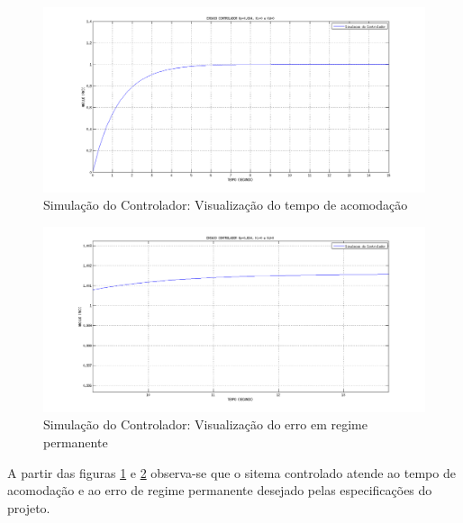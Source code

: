 \documentclass[12pt,oneside,a4paper, chapter=TITLE, section = TITLE, english, brazil]{abntex2}
\begin{document}
\begin{figure}[h] %
\centering
\includegraphics[scale=0.42]{./imagens/Simu_cont}
\caption[Simulação do Controlador: Visualização do tempo de acomodação]{Simulação do Controlador: Visualização do tempo de acomodação}
\label{fig:Simu_cont}
\end{figure}

\begin{figure}[h] %
\centering
\includegraphics[scale=0.42]{./imagens/Simu_cont_erro}
\caption[Simulação do Controlador: Visualização do erro em regime permanente]{Simulação do Controlador: Visualização do erro em regime permanente}
\label{fig:Simu_cont_erro}
\end{figure}

A partir das figuras \ref{fig:Simu_cont} e \ref{fig:Simu_cont_erro} observa-se que o sitema controlado atende ao tempo de acomodação e  ao erro de regime permanente desejado pelas especificações do projeto.
\end{document}
